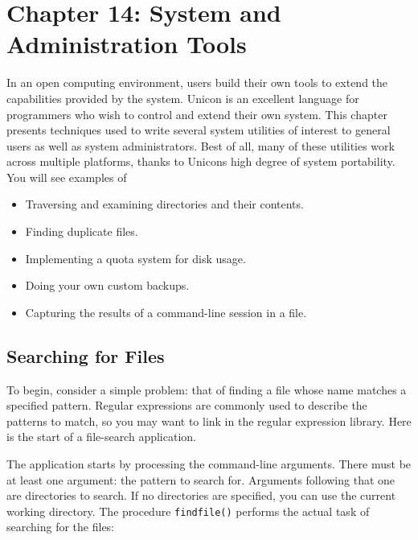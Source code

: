\clearpage\section{Chapter 14: System and Administration Tools}

In an open computing environment, users build their own tools to extend
the capabilities provided by the system. Unicon is an excellent
language for programmers who wish to control and extend their own
system. This chapter presents techniques used to write several
system utilities of interest to general users as well as system
administrators. Best of all, many of these utilities work across
multiple platforms, thanks to Unicon{\textquotesingle}s high degree of
system portability. You will see examples of

\begin{itemize}
\item Traversing and examining directories and their contents.
\item Finding duplicate files.
\item Implementing a quota system for disk usage.
\item Doing your own custom backups.
\item Capturing the results of a command-line session in a file.
\end{itemize}

\subsection{Searching for Files}

To begin, consider a simple problem: that of finding a file whose name
matches a specified pattern. Regular expressions are commonly used to
describe the patterns to match, so you may want to link in the regular
expression library. Here is the start of a file-search application.


The application starts by processing the
command-line arguments. There must be at least
one argument: the pattern to search for. Arguments following that one
are directories to search. If no directories are specified, you can use
the current working directory. The procedure
\texttt{findfile()} performs the actual task of searching for the
files: 

